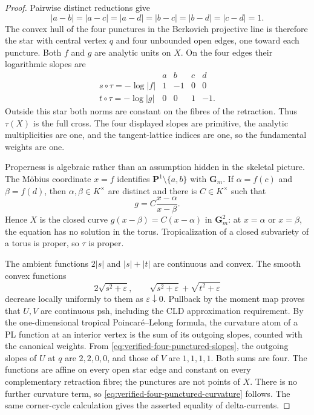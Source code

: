\begin{proof}
Pairwise distinct reductions give
\[
 |a-b|=|a-c|=|a-d|=|b-c|=|b-d|=|c-d|=1.
\tag{69.13m}\label{eq:verified-four-punctured-distances}
\]
The convex hull of the four punctures in the Berkovich projective line is
therefore the star with central vertex \(q\) and four unbounded open edges,
one toward each puncture.  Both \(f\) and \(g\) are analytic units on \(X\).
On the four edges their logarithmic slopes are
\[
\begin{array}{c|rrrr}
 &a&b&c&d\\ \hline
s\circ\tau=-\log|f|& 1&-1&0&0\\
t\circ\tau=-\log|g|& 0&0&1&-1.
\end{array}
\tag{69.13n}\label{eq:verified-four-punctured-slopes}
\]
Outside this star both norms are constant on the fibres of the retraction.
Thus \(\tau(X)\) is the full cross.  The four displayed slopes are primitive,
the analytic multiplicities are one, and the tangent-lattice indices are
one, so the fundamental weights are one.

Properness is algebraic rather than an assumption hidden in the skeletal
picture.  The M\"obius coordinate \(x=f\) identifies
\(\mathbf P^1\setminus\{a,b\}\) with \(\mathbf G_m\).  If
\(\alpha=f(c)\) and \(\beta=f(d)\), then \(\alpha,\beta\in K^\times\) are
distinct and there is \(C\in K^\times\) such that
\[
                         g=C\frac{x-\alpha}{x-\beta}.
\tag{69.13o}\label{eq:verified-four-punctured-mobius-g}
\]
Hence \(X\) is the closed curve
\(g(x-\beta)=C(x-\alpha)\) in \(\mathbf G_m^2\): at \(x=\alpha\) or
\(x=\beta\), the equation has no solution in the torus.  Tropicalization of
a closed subvariety of a torus is proper, so \(\tau\) is proper.

The ambient functions \(2|s|\) and \(|s|+|t|\) are continuous and convex.
The smooth convex functions
\[
 2\sqrt{s^2+\varepsilon},\qquad
 \sqrt{s^2+\varepsilon}+\sqrt{t^2+\varepsilon}
\]
decrease locally uniformly to them as \(\varepsilon\downarrow0\).  Pullback
by the moment map proves that \(U,V\) are continuous psh, including the CLD
approximation requirement.  By the one-dimensional tropical
Poincar\'e--Lelong formula, the curvature atom of a PL function at an
interior vertex is the sum of its outgoing slopes, counted with the
canonical weights.  From \eqref{eq:verified-four-punctured-slopes}, the
outgoing slopes of \(U\) at \(q\) are \(2,2,0,0\), and those of \(V\) are
\(1,1,1,1\).  Both sums are four.  The functions are affine on every open
star edge and constant on every complementary retraction fibre; the
punctures are not points of \(X\).  There is no further curvature term, so
\eqref{eq:verified-four-punctured-curvature} follows.  The same corner-cycle
calculation gives the asserted equality of delta-currents.


\end{proof}
